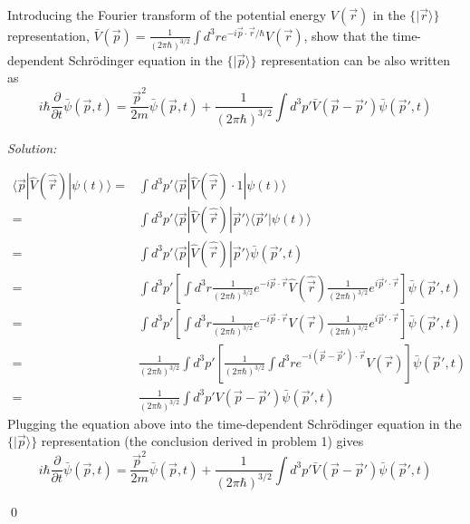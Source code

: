 \documentclass[12pt,a4paper]{article}
\newenvironment{problem}[2][Problem]{\begin{trivlist}
\item[\hskip \labelsep {\bfseries #1}\hskip \labelsep {\bfseries #2.}]}{\end{trivlist}}
\newenvironment{sol}
    {\emph{Solution:}
    }
    {
    \qed
    }
\begin{document}
\begin{problem}{2}
Introducing the Fourier transform of the potential energy $V(\vec{r})$ in the $\{|\vec{r}\rangle\}$ representation, $\bar{V}(\vec{p})=\frac{1}{(2\pi\hbar)^{3/2}}\int d^3re^{-i\vec{p}\cdot\vec{r}/\hbar}V(\vec{r})$, show that the time-dependent Schrödinger equation in the $\{|\vec{p}\rangle\}$ representation can be also written as
\[
i\hbar\frac{\partial}{\partial t}\bar{\psi}(\vec{p},t)=\frac{\vec{p}^2}{2m}\bar{\psi}(\vec{p},t)+\frac{1}{(2\pi\hbar)^{3/2}}\int d^3p'\bar{V}(\vec{p}-\vec{p}')\bar{\psi}(\vec{p}',t)
\]
\end{problem}
\begin{sol}
\begin{align}
\nonumber\langle\vec{p}|\hat{V}(\hat{\vec{r}})|\psi(t)\rangle=&\int d^3p'\langle\vec{p}|\hat{V}(\hat{\vec{r}})\cdot1|\psi(t)\rangle\\
\nonumber=&\int d^3p'\langle\vec{p}|\hat{V}(\hat{\vec{r}})|\vec{p}'\rangle\langle\vec{p}'|\psi(t)\rangle\\
\nonumber=&\int d^3p'\langle\vec{p}|\hat{V}(\hat{\vec{r}})|\vec{p}'\rangle\bar{\psi}(\vec{p}',t)\\
\nonumber=&\int d^3p'\left[\int d^3r\frac{1}{(2\pi\hbar)^{3/2}}e^{-i\vec{p}\cdot\vec{r}}\hat{V}(\hat{\vec{r}})\frac{1}{(2\pi\hbar)^{3/2}}e^{i\vec{p}'\cdot\vec{r}}\right]\bar{\psi}(\vec{p}',t)\\
\nonumber=&\int d^3p'\left[\int d^3r\frac{1}{(2\pi\hbar)^{3/2}}e^{-i\vec{p}\cdot\vec{r}}V(\vec{r})\frac{1}{(2\pi\hbar)^{3/2}}e^{i\vec{p}'\cdot\vec{r}}\right]\bar{\psi}(\vec{p}',t)\\
\nonumber=&\frac{1}{(2\pi\hbar)^{3/2}}\int d^3p'\left[\frac{1}{(2\pi\hbar)^{3/2}}\int d^3re^{-i(\vec{p}-\vec{p}')\cdot\vec{r}}V(\vec{r})\right]\bar{\psi}(\vec{p}',t)\\
\nonumber=&\frac{1}{(2\pi\hbar)^{3/2}}\int d^3p'V(\vec{p}-\vec{p}')\bar{\psi}(\vec{p}',t)
\end{align}
Plugging the equation above into the time-dependent Schrödinger equation in the $\{|\vec{p}\rangle\}$ representation (the conclusion derived in problem 1) gives
\begin{equation}
i\hbar\frac{\partial}{\partial t}\bar{\psi}(\vec{p},t)=\frac{\vec{p}^2}{2m}\bar{\psi}(\vec{p},t)+\frac{1}{(2\pi\hbar)^{3/2}}\int d^3p'\bar{V}(\vec{p}-\vec{p}')\bar{\psi}(\vec{p}',t)
\end{equation}
\end{sol}
\end{document}
